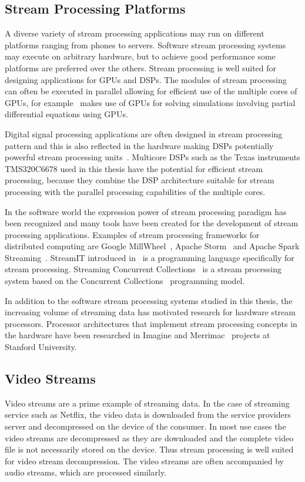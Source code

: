\subsection{Stream Processing Platforms}
\label{subsec:stream-processing-platforms}
A diverse variety of stream processing applications may run on different platforms ranging from phones to servers. Software stream processing systems may execute on arbitrary hardware, but to achieve good performance some platforms are preferred over the others. Stream processing is well suited for designing applications for GPUs and DSPs. The modules of stream processing can often be executed in parallel allowing for efficient use of the multiple cores of GPUs, for example~\cite{goddeke2011fast} makes use of GPUs for solving simulations involving partial differential equations using GPUs.

Digital signal processing applications are often designed in stream processing pattern and this is also reflected in the hardware making DSPs potentially powerful stream processing units~\cite{lee2015introduction}. Multicore DSPs such as the Texas instruments TMS320C6678 used in this thesis have the potential for efficient stream processing, because they combine the DSP architecture suitable for stream processing with the parallel processing capabilities of the multiple cores.

In the software world the expression power of stream processing paradigm has been recognized and many tools have been created for the development of stream processing applications. Examples of stream processing frameworks for distributed computing are Google MillWheel~\cite{tyler2013millwheel}, Apache Storm~\cite{apache2016storm} and Apache Spark Streaming~\cite{apache2016spark}. StreamIT introduced in~\cite{thies2002streamit} is a programming language specifically for stream processing. Streaming Concurrent Collections~\cite{sbirlea2011scnc} is a stream processing system based on the Concurrent Collections~\cite{budimlic2010concurrent} programming model.

In addition to the software stream processing systems studied in this thesis, the increasing volume of streaming data has motivated research for hardware stream processors. Processor architectures that implement stream processing concepts in the hardware have been researched in Imagine \cite{kapasi2002imagine} and Merrimac~\cite{dally2003merrimac} projects at Stanford University.

\subsection{Video Streams}
\label{subsec:video-streams}
Video streams are a prime example of streaming data. In the case of streaming service such as Netflix, the video data is downloaded from the service providers server and decompressed on the device of the consumer. In most use cases the video streams are decompressed as they are downloaded and the complete video file is not necessarily stored on the device. Thus stream processing is well suited for video stream decompression. The video streams are often accompanied by audio streams, which are processed similarly.~\cite{richardson2002video}


